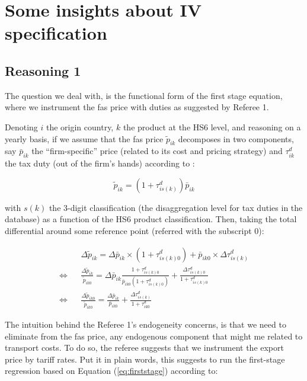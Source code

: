 \documentclass[11pt,twoside, authoryear]{elsarticle}
\begin{document}
\section{Some insights about IV specification}


\subsection{Reasoning 1}


The question we deal with, is the functional form of the first stage equation, where we instrument the fas price with duties as suggested by Referee 1.

Denoting $i$ the origin country, $k$ the product at the HS6 level, and reasoning on a yearly basis, if we assume that the fas price $\widetilde{p}_{ik}$ decomposes in two components, say $\bar{p}_{ik}$ the ``firm-specific'' price (related to its cost and pricing strategy) and $\tau^d_{ik}$ the tax duty (out of the firm's hands) according to :

$$\widetilde{p}_{ik} = (1+\tau^d_{is(k)})\bar{p}_{ik}$$

\noindent with $s(k)$ the 3-digit classification (the disaggregation level for tax duties in the database) as a function of the HS6 product classification. Then, taking the total differential around some reference point (referred with the subscript $0$):

\begin{eqnarray}
&&\Delta \widetilde{p}_{ik} = \Delta \bar{p}_{ik}\times (1+\tau^d_{is(k)0}) + \bar{p}_{ik0}\times \Delta \tau^d_{is(k)} \\
\Leftrightarrow &&\frac{\Delta \widetilde{p}_{ik}}{\widetilde{p}_{ik0}} = \Delta \bar{p}_{ik} \frac{1+\tau^d_{is(k)0}}{\bar{p}_{ik0}(1+\tau^d_{is(k)0})} +\frac{\Delta \tau^d_{is(k)0}}{1+\tau_{is(k)0}^d} \\
\Leftrightarrow &&\frac{\Delta \widetilde{p}_{ik0}}{\widetilde{p}_{ik0}} =  \frac{\Delta \bar{p}_{ik}}{\bar{p}_{ik0}} +\frac{\Delta \tau^d_{is(k)}}{1+\tau_{ik0}^d} \label{eq:firststage}
\end{eqnarray}

The intuition behind the Referee 1's endogeneity concerns, is that we need to eliminate from the fas price, any endogenous component that might me related to transport costs. To do so, the referee suggests that we instrument the export price by tariff rates. Put it in plain words, this suggests to run the first-stage regression based on Equation (\ref{eq:firststage}) according to:
\end{document}
